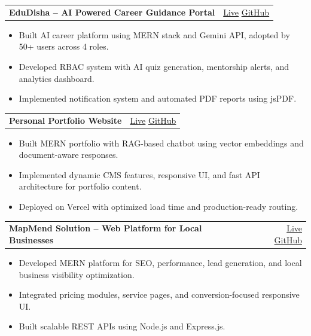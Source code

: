 \documentclass[a4paper,10pt]{article}
\begin{document}
\begin{tabularx}{\linewidth}{@{}X r@{}}
\textbf{EduDisha -- AI Powered Career Guidance Portal} &
\href{https://edudisha-portal.onrender.com}{Live} \quad
\href{https://github.com/kamranahmad786/career-guidance-portal}{GitHub} \\
\end{tabularx}
\begin{itemize}
\item Built AI career platform using MERN stack and Gemini API, adopted by 50+ users across 4 roles.
\item Developed RBAC system with AI quiz generation, mentorship alerts, and analytics dashboard.
\item Implemented notification system and automated PDF reports using jsPDF.
\end{itemize}

\begin{tabularx}{\linewidth}{@{}X r@{}}
\textbf{Personal Portfolio Website} &
\href{https://kamverse.vercel.app}{Live} \quad
\href{https://github.com/kamranahmad786/Kamverse}{GitHub} \\
\end{tabularx}
\begin{itemize}
\item Built MERN portfolio with RAG-based chatbot using vector embeddings and document-aware responses.
\item Implemented dynamic CMS features, responsive UI, and fast API architecture for portfolio content.
\item Deployed on Vercel with optimized load time and production-ready routing.
\end{itemize}

\begin{tabularx}{\linewidth}{@{}X r@{}}
\textbf{MapMend Solution -- Web Platform for Local Businesses} &
\href{https://mapmendsolution.vercel.app}{Live} \quad
\href{https://github.com/kamranahmad786/mapmend-solution}{GitHub} \\
\end{tabularx}
\begin{itemize}
\item Developed MERN platform for SEO, performance, lead generation, and local business visibility optimization.
\item Integrated pricing modules, service pages, and conversion-focused responsive UI.
\item Built scalable REST APIs using Node.js and Express.js.
\end{itemize}
\end{document}
